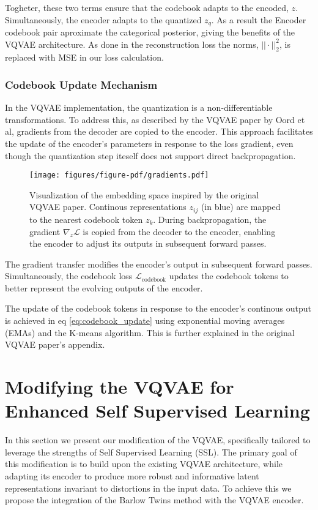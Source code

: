 Togheter, these two terms ensure that the codebook adapts to the encoded, $z$. Simultaneously, the encoder adapts to the quantized $z_q$. As a result the Encoder codebook pair aproximate the categorical posterior, giving the benefits of the VQVAE architecture.
As done in the reconstruction loss the norms, $||\cdot||_2^2$, is replaced with MSE in our loss calculation.

\subsubsection{Codebook Update Mechanism}
In the VQVAE implementation, the quantization is a non-differentiable transformations. To address this, as described by the VQVAE paper by Oord et al\cite{neuvqvae}, gradients from the decoder are copied to the encoder. 
This approach facilitates the update of the encoder's parameters in response to the loss gradient, even though the quantization step iteself does not support direct backpropagation.

\begin{figure}[H]
    \texttt{[image: figures/figure-pdf/gradients.pdf]}
    \caption{Visualization of the embedding space inspired by the original VQVAE paper\cite{neuvqvae}. Continous representations $z_{ij}$ (in blue) are mapped to the nearest codebook token $z_k$. During backpropagation, the gradient $\nabla_z\mathcal{L}$ is copied from the decoder to the encoder, enabling the encoder to adjust its outputs in subsequent forward passes.}
\end{figure}

The gradient transfer modifies the encoder's output in subsequent forward passes. Simultaneously, the codebook loss $\mathcal{L}_\text{codebook}$ updates the codebook tokens to better represent the evolving outputs of the encoder. 

The update of the codebook tokens in response to the encoder's continous output is achieved in eq \ref{eq:codebook_update} using exponential moving averages (EMAs) and the K-means algorithm. This is further 
explained in the original VQVAE paper's appendix\cite{neuvqvae}.

\section{Modifying the VQVAE for Enhanced Self Supervised Learning}
In this section we present our modification of the VQVAE, specifically tailored to leverage the strengths of Self Supervised Learning (SSL).
The primary goal of this modification is to build upon the existing VQVAE architecture, while adapting its encoder to produce more robust and informative latent representations invariant to distortions in the input data.
To achieve this we propose the integration of the Barlow Twins method with the VQVAE encoder.


